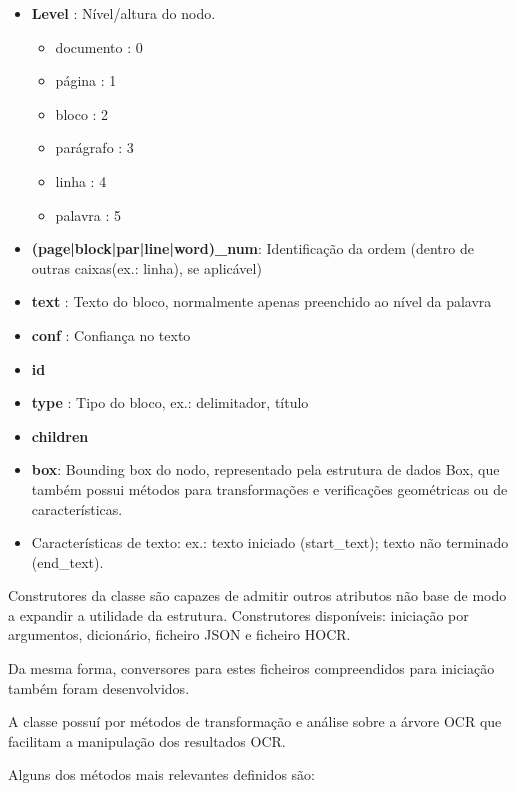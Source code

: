 \begin{itemize}\setlength\itemsep{0.05cm}
	\item \textbf{Level} : Nível/altura do nodo.
	\begin{itemize}\setlength\itemsep{0.05cm}
		\item documento : 0
		\item página 	: 1
		\item bloco		: 2
		\item parágrafo : 3
		\item linha 	: 4
		\item palavra	: 5
	\end{itemize}\setlength\itemsep{0.05cm}
	\item \textbf{(page|block|par|line|word)\_num}: Identificação da ordem (dentro de outras caixas(ex.: linha), se aplicável)
	\item \textbf{text} : Texto do bloco, normalmente apenas preenchido ao nível da palavra
	\item \textbf{conf} : Confiança no texto
	\item \textbf{id}
	\item \textbf{type} : Tipo do bloco, ex.: delimitador, título
	\item \textbf{children}
	\item \textbf{box}: Bounding box do nodo, representado pela estrutura de dados Box, que também possui métodos para transformações e verificações geométricas ou de características.
	\item Características de texto: ex.: texto iniciado (start\_text); texto não terminado (end\_text).
\end{itemize}

Construtores da classe são capazes de admitir outros atributos não base de modo a expandir a utilidade da estrutura. Construtores disponíveis: iniciação por argumentos, dicionário, ficheiro JSON e ficheiro HOCR.

Da mesma forma, conversores para estes ficheiros compreendidos para iniciação também foram desenvolvidos.

A classe possuí por métodos de transformação e análise sobre a árvore OCR que facilitam a manipulação dos resultados OCR. 

Alguns dos métodos mais relevantes definidos são:

